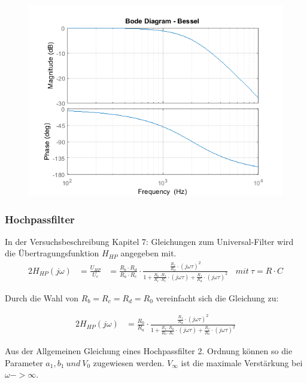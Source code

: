 \begin{figure}[h]
\centering
\includegraphics[width=0.7\linewidth]{Bilder/TP_Bessel}
\caption{}
\label{fig:TP_Bessel}
\end{figure}

\newpage


\subsubsection{Hochpassfilter}

In der Versuchsbeschreibung \cite{Aufgabenstellung} Kapitel 7: Gleichungen zum Universal-Filter wird die Übertragungsfunktion $H_{HP}$ angegeben mit.\\

\begin{alignat}{2}
H_{HP} (j \omega)&= \frac{U_{HP}}{U_{e}} &= \frac{R_{b} \cdot R_{d}}{R_{a} \cdot R_{c}} \cdot \frac{ \frac{R_{f} }{R_{d}} \cdot \left( j \omega \tau \right)^2 }{1+\frac{R_{b} \cdot R_{f}}{R_{c} \cdot R_{e}} \cdot  \left(j \omega \tau \right) + \frac{R_{f}}{R_{d}} \cdot \left ( j \omega \tau \right)^2}~~~~ mit ~\tau = R \cdot C
\end{alignat}

\noindent Durch die Wahl von $R_{b} = R_{c} = R_{d} = R_{0}$ vereinfacht sich die Gleichung zu:

\begin{alignat}{2}
H_{HP} (j \omega) &= \frac{R_{0}}{R_{a}} \cdot \frac{ 	\frac{R_{f} }{R_{d}} \cdot \left( j \omega \tau \right)^2 }	 {1+\frac{R_{f} \cdot R_{0}}{R_{0} \cdot R_{e}} \cdot  \left(j \omega \tau \right) + \frac{R_{f}}{R_{0}} \cdot \left ( j \omega \tau \right)^2}
\end{alignat}

\noindent Aus der Allgemeinen Gleichung eines Hochpassfilter 2. Ordnung können so die Parameter $a_{1}, b_{1}~und~V_{0}$ zugewiesen werden. $V_{\infty}$ ist die maximale Verstärkung bei $\omega -> \infty$.

